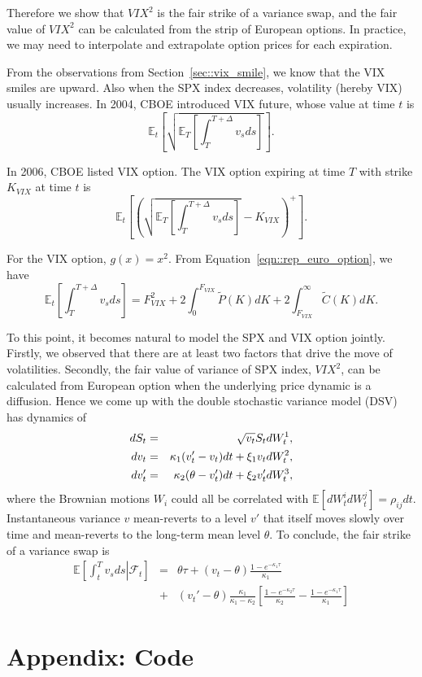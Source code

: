 \documentclass[11pt,reqno,final]{amsart}
\begin{document}
Therefore we show that $VIX^2$ is the fair strike of a variance swap, and the fair value of $VIX^2$ can be calculated from the strip of European options. In practice, we may need to interpolate and extrapolate option prices for each expiration.

From the observations from Section~\ref{sec::vix_smile}, we know that the VIX smiles are upward. Also when the SPX index decreases, volatility (hereby VIX) usually increases. In 2004, CBOE introduced VIX future, whose value at time $t$ is
$$
\mathbb{E}_t\left[\sqrt{\mathbb{E}_T\left[\int_{T}^{T+\Delta} v_s ds\right]}\right].
$$

In 2006, CBOE listed VIX option. The VIX option expiring at time $T$ with strike $K_{VIX}$ at time $t$ is
$$
\mathbb{E}_t\left[\left(\sqrt{\mathbb{E}_T\left[\int_{T}^{T+\Delta} v_s ds\right]} - K_{VIX}\right)^{+}\right].
$$

For the VIX option, $g(x)=x^2$. From Equation~\ref{eqn::rep_euro_option}, we have
$$
\mathbb{E}_t\left[\int_T^{T+\Delta} v_s ds\right] = F_{VIX}^2 + 2\int_{0}^{F_{VIX}} \tilde{P}(K)dK + 2\int_{F_{VIX}}^{\infty}\tilde{C}(K) dK.
$$

To this point, it becomes natural to model the SPX and VIX option jointly. Firstly, we observed that there are at least two factors that drive the move of volatilities. Secondly, the fair value of variance of SPX index, $VIX^2$, can be calculated from European option when the underlying price dynamic is a diffusion. Hence we come up with the double stochastic variance model (DSV) has dynamics of
\begin{eqnarray}
dS_t &=& \sqrt{v_t} S_t d W_t^1, \notag \\
dv_t &=& \kappa_1 (v_t' - v_t) dt + \xi_1 v_t dW_t^2, \\
dv_t' &=& \kappa_2 (\theta - v_t') dt + \xi_2 v_t' dW_t^3, \notag \\
\end{eqnarray}
where the Brownian motions $W_i$ could all be correlated with $\mathbb{E}[dW_t^i dW_t^j]=\rho_{ij} dt$. Instantaneous variance $v$ mean-reverts to a level $v'$ that itself moves slowly over time and mean-reverts to the long-term mean level $\theta$. To conclude, the fair strike of a variance swap is
\begin{eqnarray*}
\mathbb{E}\left[ \left.\int_t^T v_s ds \right| \mathcal{F}_t\right] &=& \theta \tau + (v_t-\theta) \frac{1-e^{-\kappa_1\tau}}{\kappa_1} \\
    &+& (v_t'-\theta)\frac{\kappa_1}{\kappa_1-\kappa_2}\left[\frac{1-e^{-\kappa_2\tau}}{\kappa_2}- \frac{1-e^{-\kappa_1\tau}}{\kappa_1}\right]
\end{eqnarray*}
%
%


%
%
\newpage
\section*{Appendix: Code}

\end{document}
